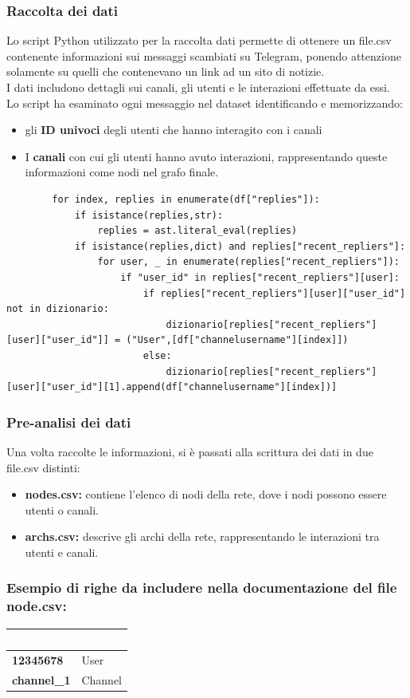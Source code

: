 \documentclass[12pt]{article}
\begin{document}
	\subsubsection{Raccolta dei dati}
	Lo script Python utilizzato per la raccolta dati permette di ottenere un file.csv contenente informazioni sui messaggi scambiati su Telegram, ponendo attenzione solamente su quelli che contenevano un link ad un sito di notizie.\\
	I dati includono dettagli sui canali, gli utenti e le interazioni effettuate da essi.\\
	Lo script ha esaminato ogni messaggio nel dataset identificando e memorizzando:
	\begin{itemize}[label=] 
		\item gli \textbf{ID univoci} degli utenti che hanno interagito con i canali
		\item I \textbf{canali} con cui gli utenti hanno avuto interazioni, rappresentando queste informazioni come nodi nel grafo finale.
	\end{itemize}
	\begin{lstlisting}
		for index, replies in enumerate(df["replies"]):
			if isistance(replies,str):
				replies = ast.literal_eval(replies)
			if isistance(replies,dict) and replies["recent_repliers"]:
				for user, _ in enumerate(replies["recent_repliers"]):
					if "user_id" in replies["recent_repliers"][user]:
						if replies["recent_repliers"][user]["user_id"] not in dizionario:
							dizionario[replies["recent_repliers"][user]["user_id"]] = ("User",[df["channelusername"][index]])
						else:
							dizionario[replies["recent_repliers"][user]["user_id"][1].append(df["channelusername"][index])]
	\end{lstlisting}
	\subsubsection{Pre-analisi dei dati}
	Una volta raccolte le informazioni, si è passati alla scrittura dei dati in due file.csv distinti:
	\begin{itemize}[label=] 
		\item \textbf{nodes.csv:} contiene l'elenco di nodi della rete, dove i nodi possono essere utenti o canali.
		\item \textbf{archs.csv:} descrive gli archi della rete, rappresentando le interazioni tra utenti e canali.
	\end{itemize}
	\subsubsection{Esempio di righe da includere nella documentazione del file node.csv:}
	\begin{tabular}{|p{6cm}|p{8cm}|}
		\hline
		\cellcolor{darkblue}\textcolor{white}{\textbf{ID}} & \cellcolor{darkblue}\textcolor{white}{\textbf{Type}} \\
		\hline
		\textbf{12345678} & User \\
		\hline
		\textbf{channel\_1} & Channel\\
		\hline
	\end{tabular}
\end{document}
